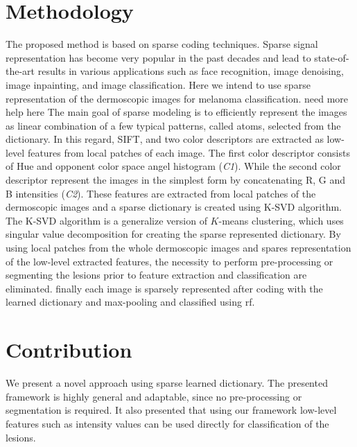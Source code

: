 \section{Methodology}
\label{sec:method}
\graphicspath{ {./content/method/figures/} }
The proposed method is based on sparse coding techniques. 
Sparse signal representation has become very popular in the past decades and lead to state-of-the-art results in various applications such as face recognition, image denoising, image inpainting, and image classification. 
Here we intend to use sparse representation of the dermoscopic images for melanoma classification.
{\color{red}need more help here}
The main goal of sparse modeling is to efficiently represent the images as linear combination of a few typical patterns, called atoms, selected from the dictionary. 
In this regard, SIFT, and two color descriptors are extracted as low-level features from local patches of each image. 
The first color descriptor consists of Hue and opponent color space angel histogram (\textit{C1}). 
While the second color descriptor represent the images in the simplest form by concatenating R, G and B intensities (\textit{C2}). 
These features are extracted from local patches of the dermoscopic images and a sparse dictionary is created using  
K-SVD algorithm. 
The K-SVD algorithm is a generalize version of $K$-means clustering, which uses singular value decomposition for creating the sparse represented dictionary.
By using local patches from the whole dermoscopic images and spares representation of the low-level extracted features, the necessity to perform pre-processing or segmenting the lesions prior to feature extraction and classification are eliminated.
finally each image is sparsely represented after coding with the learned dictionary and max-pooling and classified using \ac{rf}. 


\section{Contribution}
We present a novel approach using sparse learned dictionary. The presented framework is highly general and adaptable, since no pre-processing or segmentation is required. It also presented that using our framework low-level features such as intensity values can be used directly for classification of the lesions. 




